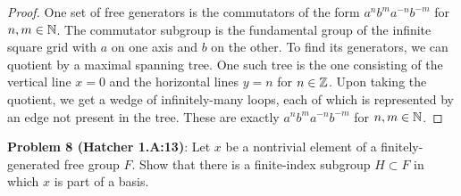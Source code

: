 \documentclass{amsart}
\begin{document}
\begin{proof}
	One set of free generators is the commutators of the form $a^nb^ma^{-n}b^{-m}$ for $n,m\in \mathbb{N}$. The commutator subgroup is the fundamental group of the infinite square grid with $a$ on one axis and $b$ on the other. To find its generators, we can quotient by a maximal spanning tree. One such tree is the one consisting of the vertical line $x=0$ and the horizontal lines $y=n$ for $n\in \mathbb{Z}$. Upon taking the quotient, we get a wedge of infinitely-many loops, each of which is represented by an edge not present in the tree. These are exactly $a^nb^ma^{-n}b^{-m}$ for $n,m\in \mathbb{N}$.
\end{proof}

\newpage 
\noindent \textbf{Problem 8 (Hatcher 1.A:13)}: Let $x$ be a nontrivial element of a finitely-generated free group $F$. Show that there is a finite-index subgroup $H\subset F$ in which $x$ is part of a basis.
\end{document}

